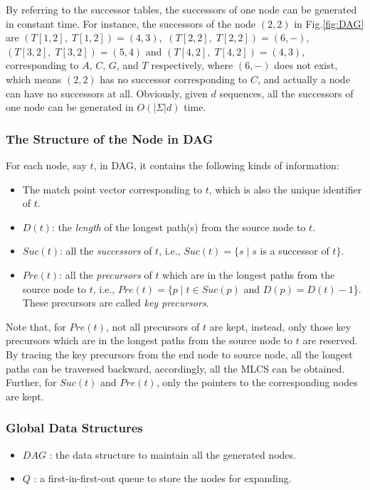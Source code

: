 \documentclass{article}
\begin{document}
By referring to the successor tables, the successors of one node can
be generated in constant time. For instance, the successors of the
node $(2, 2)$ in Fig.\ref{fig:DAG} are
$(T[1, 2],\;T[1, 2]) = (4, 3)$,\, $(T[2, 2],\;T[2, 2]) = (6, -)$,\,
$(T[3, 2],\;T[3, 2]) = (5, 4)$ and $(T[4, 2],\;T[4, 2]) = (4, 3)$,
corresponding to $A$, $C$, $G$, and $T$ respectively, where $(6, -)$
does not exist, which means $(2, 2)$ has no successor corresponding to
$C$, and actually a node can have no successors at all. Obviously,
given $d$ sequences, all the successors of one node can be generated
in $O(|\Sigma|d)$ time.

\subsubsection{The Structure of the Node in DAG}
\label{sec:Node}

For each node, say $t$, in DAG, it contains the following kinds of
information:

\begin{itemize}
\item The match point vector corresponding to $t$, which is also the
  unique identifier of $t$.
\item $D(t)$: the \emph{length} of the longest path(s) from the source
  node to $t$.
\item $Suc(t)$: all the \emph{successors} of $t$, i.e.,
  $Suc(t) = \{s\;|\; s$ is a successor of $t\}$.
\item $Pre(t)$: all the \emph{precursors} of $t$ which are in the
  longest paths from the source node to $t$, i.e.,
  $Pre(t) = \{p\;|\; t \in Suc(p)$ and $D(p) = D(t) - 1$\}. These
  precursors are called \emph{key precursors}.
\end{itemize}

Note that, for $Pre(t)$, not all precursors of $t$ are kept, instead,
only those key precursors which are in the longest paths from the
source node to $t$ are reserved. By tracing the key precursors from
the end node to source node, all the longest paths can be traversed
backward, accordingly, all the MLCS can be obtained. Further, for
$Suc(t)$ and $Pre(t)$, only the pointers to the corresponding nodes
are kept.

\subsubsection{Global Data Structures}
\label{sec:auxiliary}

\begin{itemize}
\item $DAG$ : the data structure to maintain all the generated nodes.
\item $Q$ : a first-in-first-out queue to store the nodes for
  expanding.
\end{itemize}
\end{document}
